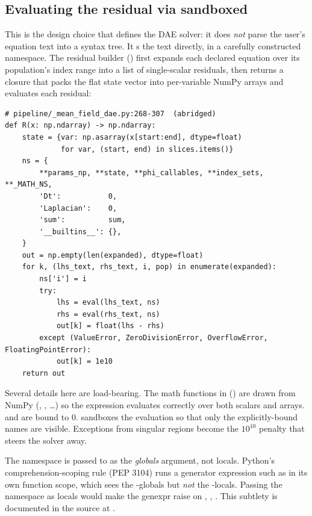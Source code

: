 \subsection{Evaluating the residual via sandboxed }

This is the design choice that defines the DAE solver: it does \emph{not} parse
the user's equation text into a syntax tree. It s the text directly,
in a carefully constructed namespace. The residual builder
 () first expands each
declared equation over its population's index range into a list of single-scalar
residuals, then returns a closure  that packs the flat state vector
into per-variable NumPy arrays and evaluates each residual:

\begin{lstlisting}
# pipeline/_mean_field_dae.py:268-307  (abridged)
def R(x: np.ndarray) -> np.ndarray:
    state = {var: np.asarray(x[start:end], dtype=float)
             for var, (start, end) in slices.items()}
    ns = {
        **params_np, **state, **phi_callables, **index_sets, **_MATH_NS,
        'Dt':           0,
        'Laplacian':    0,
        'sum':          sum,
        '__builtins__': {},
    }
    out = np.empty(len(expanded), dtype=float)
    for k, (lhs_text, rhs_text, i, pop) in enumerate(expanded):
        ns['i'] = i
        try:
            lhs = eval(lhs_text, ns)
            rhs = eval(rhs_text, ns)
            out[k] = float(lhs - rhs)
        except (ValueError, ZeroDivisionError, OverflowError, FloatingPointError):
            out[k] = 1e10
    return out
\end{lstlisting}

Several details here are load-bearing. The math functions in 
() are drawn from NumPy (,
, \dots) so the expression evaluates correctly over both scalars and
arrays.  and  are bound to $0$.
 sandboxes the evaluation so that only the
explicitly-bound names are visible. Exceptions from singular regions become the
$10^{10}$ penalty that steers the solver away.

\begin{gotcha}
The namespace is passed to  as the \emph{globals} argument, not
locals. Python's comprehension-scoping rule (PEP 3104) runs a generator
expression such as  in its own function scope,
which sees the -globals but \emph{not} the -locals. Passing
the namespace as locals would make the genexpr raise  on
, , . This subtlety is documented in the source at
.
\end{gotcha}

